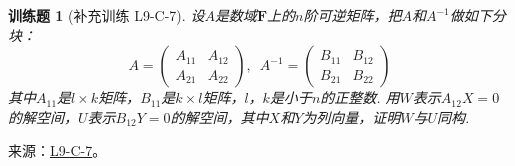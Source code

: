 \documentclass[12pt,fontset=fandol]{ctexart}
\newtheorem{exercise}{训练题}[section]
\begin{document}
\begin{exercise}[补充训练 L9-C-7]\label{prob:L9-C-7}
设$A$是数域$\mathbf{F}$上的$n$阶可逆矩阵，把$A$和$A^{-1}$做如下分块：
        \[A=\begin{pmatrix}
                A_{11} & A_{12} \\ A_{21} & A_{22}
            \end{pmatrix},\enspace A^{-1}=\begin{pmatrix}
                B_{11} & B_{12} \\ B_{21} & B_{22}
            \end{pmatrix}\]
        其中$A_{11}$是$l \times k$矩阵，$B_{11}$是$k \times l$矩阵，$l$，$k$是小于$n$的正整数. 用$W$表示$A_{12}X=0$的解空间，$U$表示$B_{12}Y=0$的解空间，其中$X$和$Y$为列向量，证明$W$与$U$同构.
\end{exercise}
\noindent 来源：\href{https://github.com/yhwu-is/Linear-Algebra-Left-Undone/blob/new/%E8%AE%B2%E4%B9%89/%E4%B8%93%E9%A2%98/9%20%E7%9F%A9%E9%98%B5%E8%BF%90%E7%AE%97%E8%BF%9B%E9%98%B6.tex}{L9-C-7}。
\end{document}
